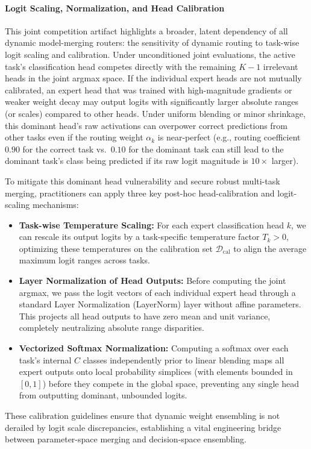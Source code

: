 \paragraph{Logit Scaling, Normalization, and Head Calibration}
This joint competition artifact highlights a broader, latent dependency of all dynamic model-merging routers: the sensitivity of dynamic routing to task-wise logit scaling and calibration. Under unconditioned joint evaluations, the active task's classification head competes directly with the remaining $K-1$ irrelevant heads in the joint argmax space. If the individual expert heads are not mutually calibrated, an expert head that was trained with high-magnitude gradients or weaker weight decay may output logits with significantly larger absolute ranges (or scales) compared to other heads. Under uniform blending or minor shrinkage, this dominant head's raw activations can overpower correct predictions from other tasks even if the routing weight $\alpha_k$ is near-perfect (e.g., routing coefficient $0.90$ for the correct task vs.\ $0.10$ for the dominant task can still lead to the dominant task's class being predicted if its raw logit magnitude is $10\times$ larger). 

To mitigate this dominant head vulnerability and secure robust multi-task merging, practitioners can apply three key post-hoc head-calibration and logit-scaling mechanisms:
\begin{itemize}
    \item \textbf{Task-wise Temperature Scaling:} For each expert classification head $k$, we can rescale its output logits by a task-specific temperature factor $T_k > 0$, optimizing these temperatures on the calibration set $\mathcal{D}_{\text{cal}}$ to align the average maximum logit ranges across tasks.
    \item \textbf{Layer Normalization of Head Outputs:} Before computing the joint argmax, we pass the logit vectors of each individual expert head through a standard Layer Normalization (LayerNorm) layer without affine parameters. This projects all head outputs to have zero mean and unit variance, completely neutralizing absolute range disparities.
    \item \textbf{Vectorized Softmax Normalization:} Computing a softmax over each task's internal $C$ classes independently prior to linear blending maps all expert outputs onto local probability simplices (with elements bounded in $[0, 1]$) before they compete in the global space, preventing any single head from outputting dominant, unbounded logits.
\end{itemize}
These calibration guidelines ensure that dynamic weight ensembling is not derailed by logit scale discrepancies, establishing a vital engineering bridge between parameter-space merging and decision-space ensembling.

